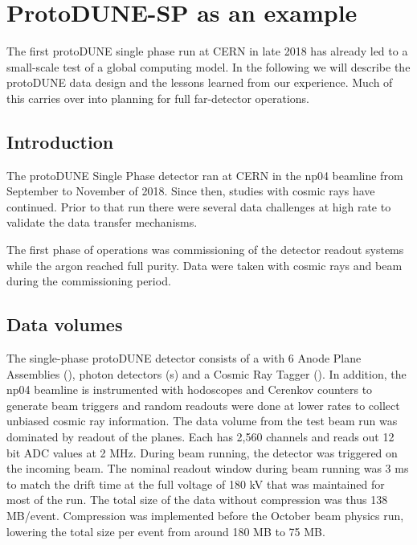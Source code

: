 \section{ProtoDUNE-SP as an example}		
\label{ch:exec-comp-proto-SP}
The first protoDUNE single phase run at CERN in late 2018 has already led to a small-scale test of a global computing model.  In the following we will describe the protoDUNE data design and the lessons learned from our experience. Much of this carries over into planning for full far-detector operations. 

\subsection{Introduction}

The protoDUNE Single Phase detector ran at CERN in the np04 beamline from September to November of 2018. Since then, studies with cosmic rays have continued. Prior to that run there were several data challenges at high rate to validate the data transfer mechanisms. 

The first phase of operations was commissioning of the detector readout systems while the argon reached full purity.  Data were taken with cosmic rays and beam during the commissioning period.  



\subsection{Data volumes}
The single-phase protoDUNE detector consists of a  with  6 Anode Plane Assemblies (), photon detectors (s) and a Cosmic Ray Tagger (). In addition, the np04 beamline is instrumented with hodoscopes and Cerenkov counters to generate beam triggers and random readouts were done at lower rates to collect unbiased cosmic ray information. The data volume from the test beam run was dominated by readout of the  planes.  Each  has 2,560 channels and reads out 12 bit ADC values at 2 MHz.  During beam running, the detector was triggered on the incoming beam. The nominal readout window during beam running was  3 ms to match the drift time at the full voltage of 180 kV that was maintained for most of the run.  The total size of the  data without compression was thus 138 MB/event.  Compression was implemented before the October beam physics run, lowering the total size per event from around 180 MB to 75 MB.  

